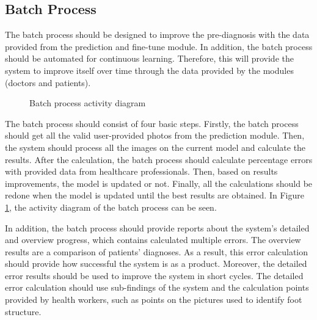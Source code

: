 \subsection{ Batch Process }

The batch process should be designed to improve the pre-diagnosis with the data provided from the prediction and fine-tune module. In addition, the batch process should be automated for continuous learning. Therefore, this will provide the system to improve itself over time through the data provided by the modules (doctors and patients). 

\begin{figure}[htbp]
\centering
{}
\caption{Batch process activity diagram}
\label{fig:BatchProcessActivityDiagram}
\end{figure}

The batch process should consist of four basic steps. Firstly, the batch process should get all the valid user-provided photos from the prediction module. Then, the system should process all the images on the current model and calculate the results. After the calculation, the batch process should calculate percentage errors with provided data from healthcare professionals. Then, based on results improvements, the model is updated or not. Finally, all the calculations should be redone when the model is updated until the best results are obtained. In Figure \ref{fig:BatchProcessActivityDiagram}, the activity diagram of the batch process can be seen.

In addition, the batch process should provide reports about the system's detailed and overview progress, which contains calculated multiple errors. The overview results are a comparison of patients' diagnoses. As a result, this error calculation should provide how successful the system is as a product. Moreover, the detailed error results should be used to improve the system in short cycles. The detailed error calculation should use sub-findings of the system and the calculation points provided by health workers, such as points on the pictures used to identify foot structure. 

